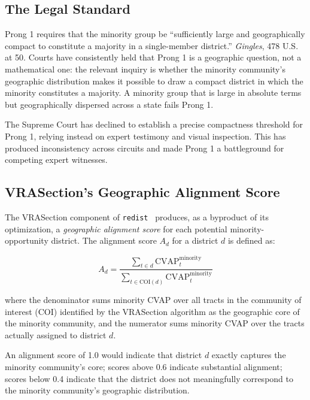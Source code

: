 \label{sec:prong1}

\subsection{The Legal Standard}

Prong 1 requires that the minority group be ``sufficiently large and
geographically compact to constitute a majority in a single-member district.''
\textit{Gingles}, 478 U.S. at 50.  Courts have consistently held that Prong 1
is a geographic question, not a mathematical one: the relevant inquiry is
whether the minority community's geographic distribution makes it possible to
draw a compact district in which the minority constitutes a majority.  A
minority group that is large in absolute terms but geographically dispersed
across a state fails Prong 1.

The Supreme Court has declined to establish a precise compactness threshold
for Prong 1, relying instead on expert testimony and visual inspection.
This has produced inconsistency across circuits and made Prong 1 a battleground
for competing expert witnesses.

\subsection{VRASection's Geographic Alignment Score}

The VRASection component of \texttt{redist}~\citep{dellaLibera2026vra}
produces, as a byproduct of its optimization, a \emph{geographic alignment
score} for each potential minority-opportunity district.  The alignment score
$A_d$ for a district $d$ is defined as:

\begin{equation}
  A_d = \frac{\sum_{t \in d} \text{CVAP}^{\text{minority}}_t}
             {\sum_{t \in \text{COI}(d)} \text{CVAP}^{\text{minority}}_t}
\end{equation}

where the denominator sums minority CVAP over all tracts in the community of
interest (COI) identified by the VRASection algorithm as the geographic core
of the minority community, and the numerator sums minority CVAP over the
tracts actually assigned to district $d$.

An alignment score of 1.0 would indicate that district $d$ exactly captures
the minority community's core; scores above 0.6 indicate substantial alignment;
scores below 0.4 indicate that the district does not meaningfully correspond
to the minority community's geographic distribution.

